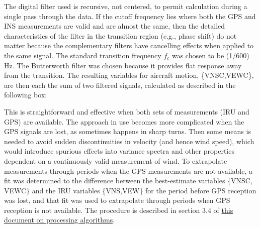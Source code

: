\documentclass[12pt,twoside,english]{article}\usepackage[]{graphicx}\usepackage[]{color}
\let\OrgIndex\index
\renewcommand*{\index}[1]{\OrgIndex{#1}}
\begin{document}
{{%
The digital filter used is recursive, not centered, to permit calculation during a single pass through the data. If the cutoff frequency lies where both the GPS and INS measurements are valid and are almost the same, then the detailed characteristics of the filter in the transition region (e.g., phase shift) do not matter because the complementary filters have cancelling effects when applied to the same signal. The standard transition frequency $f_{c}$ was chosen to be (1/600) Hz. The Butterworth filter was chosen because it provides flat response away from the transition. The resulting variables for aircraft motion, \{VNSC,VEWC\}, are then each the sum of two filtered signals, calculated as described in the following box:\\ 

This is straightforward and effective when both sets of measurements (IRU and GPS) are available. The approach in use becomes more complicated when the GPS signals are lost, as sometimes happens in sharp turns. Then some means is needed to avoid sudden discontinuities in velocity (and hence wind speed), which would introduce spurious effects into variance spectra and other properties dependent on a continuously valid measurement of wind. To extrapolate measurements through periods when the GPS measurements are not available, a fit was determined to the difference between the best-estimate variables \{VNSC, VEWC\} and the IRU variables \{VNS,VEW\} for the period before GPS reception was lost, and that fit was used to extrapolate through periods when GPS reception is not available. The procedure is described in section 3.4 of \href{https://drive.google.com/file/d/0B1kIUH45ca5ATFV5d3QyQ0JpSjA/view?usp=sharing}{this document on processing algorithms}. 

}}
\end{document}
